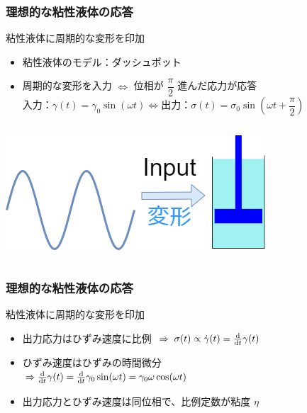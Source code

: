 \documentclass[unicode,12pt]{beamer}%
\begin{document}
\begin{frame}
    \frametitle{理想的な粘性液体の応答}
		\begin{block}{粘性液体に周期的な変形を印加}
			\begin{itemize}
				\item 粘性液体のモデル：ダッシュポット
				\item 周期的な変形を入力 $\Leftrightarrow$ 位相が $\dfrac{\pi}{2}$ 進んだ応力が応答\\
				$\text{入力：}\gamma (t) = \gamma_0 \sin(\omega t) \Leftrightarrow \text{出力：}\sigma(t) = \sigma_0 \sin(\omega t + \dfrac{\pi}{2})$
			\end{itemize}
		\end{block}
		\begin{columns}[c, onlytextwidth]
				\centering
					\includegraphics[width=\textwidth]{dynamic_Visco.png}
				
				\centering
		\end{columns}
\end{frame}

\begin{frame}
    \frametitle{理想的な粘性液体の応答}
		\begin{block}{粘性液体に周期的な変形を印加}
			\begin{itemize}
				\item 出力応力はひずみ速度に比例 $\; \Rightarrow \; \sigma (t) \propto \dot{\gamma}(t) = \odv*{\gamma (t)}{t} $
				\item ひずみ速度はひずみの時間微分 \\
				$\Rightarrow \odv*{\gamma(t)}{t} = \odv*{\gamma_0 \sin(\omega t)}{t} = \gamma_0 \omega \cos(\omega t)$
				\item 出力応力とひずみ速度は同位相で、比例定数が粘度 $\eta$
			\end{itemize}
		\end{block}

		\centering
\end{frame}
\end{document}
